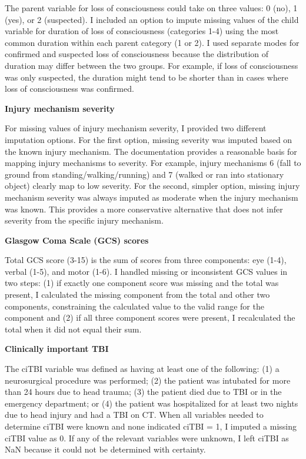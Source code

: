 \documentclass[11pt,letterpaper]{article}
\begin{document}
The parent variable for loss of consciousness could take on three values: 0 (no), 1 (yes), or 2 (suspected).
I included an option to impute missing values of the child variable for duration of loss of consciousness 
(categories 1-4) using the most common duration within each parent category (1 or 2). I used separate
modes for confirmed and suspected loss of consciousness because the distribution of duration may
differ between the two groups. For example, if loss of consciousness was only suspected, the 
duration might tend to be shorter than in cases where loss of consciousness was confirmed.

\textbf{Injury mechanism severity}

For missing values of injury mechanism severity, I provided two different imputation options.
For the first option, missing severity was imputed based on the known injury mechanism.
The documentation provides a reasonable basis for mapping injury mechanisms to severity.
For example, injury mechanisms 6 (fall to ground from standing/walking/running) and 
7 (walked or ran into stationary object) clearly map to low severity. For the second, 
simpler option, missing injury mechanism severity was always imputed as moderate when
the injury mechanism was known. This provides a more conservative alternative that 
does not infer severity from the specific injury mechanism. 

\textbf{Glasgow Coma Scale (GCS) scores}

Total GCS score (3-15) is the sum of scores from three components:
eye (1-4), verbal (1-5), and motor (1-6). I handled missing or inconsistent 
GCS values in two steps: 
(1) if exactly one component score was missing and the total was present, 
I calculated the missing component from the total and other two components,
constraining the calculated value to the valid range for the component and 
(2) if all three component scores were present, I recalculated
the total when it did not equal their sum. 

\textbf{Clinically important TBI}

The ciTBI variable was defined as having at least one of the following:
(1) a neurosurgical procedure was performed;
(2) the patient was intubated for more than 24 hours due to head trauma;
(3) the patient died due to TBI or in the emergency department; or
(4) the patient was hospitalized for at least two nights due to head injury and had a TBI on CT.
When all variables needed to determine ciTBI were known and none indicated ciTBI = 1, 
I imputed a missing ciTBI value as 0. If any of the relevant variables were unknown,
I left ciTBI as NaN because it could not be determined with certainty. 
\end{document}
